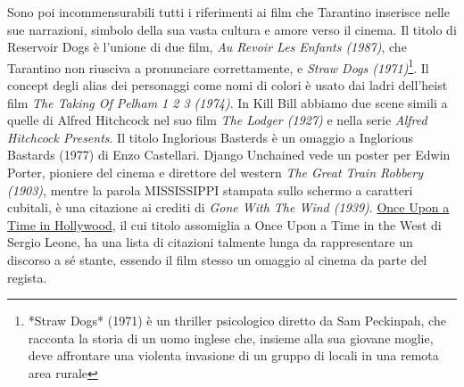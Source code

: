 \documentclass[12pt]{article} %
\begin{document}
\begin{flushleft}
    Sono poi incommensurabili tutti i riferimenti ai film che Tarantino inserisce nelle sue narrazioni, simbolo della sua vasta cultura e amore verso il cinema.
    Il titolo di Reservoir Dogs è l'unione di due film, \textit{Au Revoir Les Enfants (1987)}, che Tarantino non riusciva a pronunciare correttamente, e \textit{Straw Dogs (1971)}\footnote{*Straw Dogs* (1971) è un thriller psicologico diretto da Sam Peckinpah, che racconta la storia di un uomo inglese che, insieme alla sua giovane moglie, deve affrontare una violenta invasione di un gruppo di locali in una remota area rurale}.
    Il concept degli alias dei personaggi come nomi di colori è usato dai ladri dell'heist film \textit{The Taking Of Pelham 1 2 3 (1974)}.
    In Kill Bill abbiamo due scene simili a quelle di Alfred Hitchcock nel suo film \textit{The Lodger (1927)} e nella serie \textit{Alfred Hitchcock Presents}.
    Il titolo Inglorious Basterds è un omaggio a Inglorious Bastards (1977) di Enzo Castellari. Django Unchained vede un poster per Edwin Porter, pioniere del cinema e direttore del western \textit{The Great Train Robbery (1903)}, mentre la parola MISSISSIPPI stampata sullo schermo a caratteri cubitali, è una citazione ai crediti di \textit{Gone With The Wind (1939)}. 
    \href{https://wiki.tarantino.info/index.php/Once_Upon_a_Time_in_Hollywood_References_guide}{Once Upon a Time in Hollywood}, il cui titolo assomiglia a Once Upon a Time in the West di Sergio Leone, ha una lista di citazioni talmente lunga da rappresentare un discorso a sé stante, essendo il film stesso un omaggio al cinema da parte del regista.
\end{flushleft}
\end{document}
